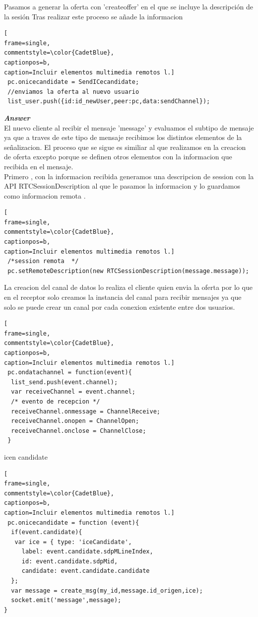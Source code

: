 Pasamos a generar la oferta con 'createoffer'  en el que se incluye la descripción de la sesión Tras realizar este proceso se añade la informacion
\begin{lstlisting}[
frame=single,
commentstyle=\color{CadetBlue},
captionpos=b,
caption=Incluir elementos multimedia remotos l.]
 pc.onicecandidate = SendICecandidate;
 //enviamos la oferta al nuevo usuario
 list_user.push({id:id_newUser,peer:pc,data:sendChannel});
\end{lstlisting}
\textbf{\textit{Answer}}
\\El nuevo cliente al recibir el mensaje 'message' y evaluamos el subtipo de mensaje ya que a traves de este tipo de mensaje recibimos los distintos elementos de la señalizacion. El proceso que se sigue es similiar al que realizamos en la creacion de oferta excepto porque se definen otros elementos con la informacion que recibida en el mensaje.
\\Primero , con la informacion recibida  generamos una descripcion de session con la API RTCSessionDescription al que le pasamos la informacion y lo guardamos como informacion remota .
\begin{lstlisting}[
frame=single,
commentstyle=\color{CadetBlue},
captionpos=b,
caption=Incluir elementos multimedia remotos l.]
 /*session remota  */
 pc.setRemoteDescription(new RTCSessionDescription(message.message));
\end{lstlisting}
La creacion del canal de datos lo realiza el cliente quien envia la oferta por lo que en el receptor solo creamos la instancia del canal para recibir mensajes ya que solo se puede crear un canal por cada conexion existente entre dos usuarios.
\begin{lstlisting}[
frame=single,
commentstyle=\color{CadetBlue},
captionpos=b,
caption=Incluir elementos multimedia remotos l.]
 pc.ondatachannel = function(event){
  list_send.push(event.channel);
  var receiveChannel = event.channel;
  /* evento de recepcion */
  receiveChannel.onmessage = ChannelReceive;
  receiveChannel.onopen = ChannelOpen;
  receiveChannel.onclose = ChannelClose;
 }
 \end{lstlisting}
 icen candidate
\begin{lstlisting}[
frame=single,
commentstyle=\color{CadetBlue},
captionpos=b,
caption=Incluir elementos multimedia remotos l.]
 pc.onicecandidate = function (event){
  if(event.candidate){
   var ice = { type: 'iceCandidate',
     label: event.candidate.sdpMLineIndex,
     id: event.candidate.sdpMid,
     candidate: event.candidate.candidate
  };
  var message = create_msg(my_id,message.id_origen,ice);
  socket.emit('message',message);
}
\end{lstlisting}
